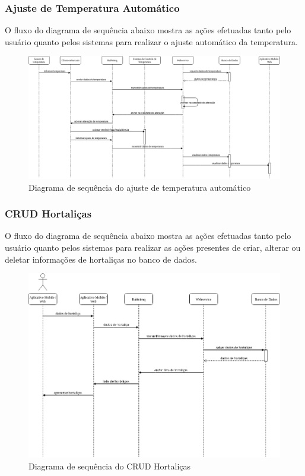 \subsubsection{Ajuste de Temperatura Automático}

O fluxo do diagrama de sequência abaixo mostra as ações efetuadas tanto pelo usuário quanto pelos sistemas para realizar o ajuste automático da temperatura.

\begin{figure}[H]
	\centering
	\includegraphics[width=16cm]{figuras/ajuste_automatico.png}
	\caption{Diagrama de sequência do ajuste de temperatura automático} \label{ajuste_automatico}
\end{figure}

\subsubsection{CRUD Hortaliças}

O fluxo do diagrama de sequência abaixo mostra as ações efetuadas tanto pelo usuário quanto pelos sistemas para realizar as ações presentes de criar, alterar ou deletar informações de hortaliças no banco de dados.

\begin{figure}[H]
	\centering
	\includegraphics[width=18cm]{figuras/crud_hortalicas.png}
	\caption{Diagrama de sequência do CRUD Hortaliças} \label{crud_hortalicas}
\end{figure}

